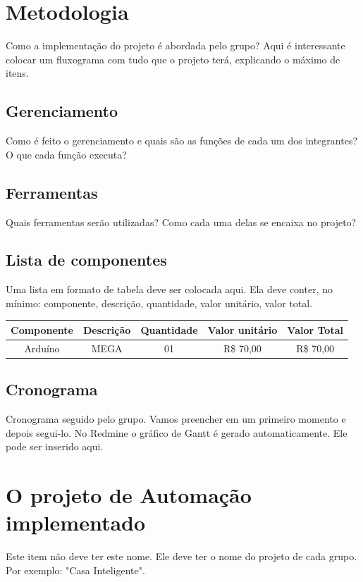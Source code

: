 \documentclass[10pt]{article}
\begin{document}
\section{Metodologia} 

Como a implementação do projeto é abordada pelo grupo? Aqui é interessante colocar um fluxograma com tudo que o projeto terá, explicando o máximo de itens.

\subsection{Gerenciamento}
Como é feito o gerenciamento e quais são as funções de cada um dos integrantes? O que cada função executa?

\subsection{Ferramentas}
Quais ferramentas serão utilizadas? Como cada uma delas se encaixa no projeto?

\subsection{Lista de componentes}

Uma lista em formato de tabela deve ser colocada aqui. Ela deve conter, no mínimo: componente, descrição, quantidade, valor unitário, valor total.
\\

\begin{tabular}{c|c|c|c|c}
\hline
Componente & Descrição & Quantidade & Valor unitário & Valor Total\\
\hline
Arduíno & MEGA & 01 & R\$ 70,00 & R\$ 70,00 \\
\hline
\end{tabular}

\subsection{Cronograma}

Cronograma seguido pelo grupo. Vamos preencher em um primeiro momento e depois segui-lo. No Redmine o gráfico de Gantt é gerado automaticamente. Ele pode ser inserido aqui.

\section{O projeto de Automação implementado}

Este item não deve ter este nome. Ele deve ter o nome do projeto de cada grupo. Por exemplo: "Casa Inteligente".
\end{document}
